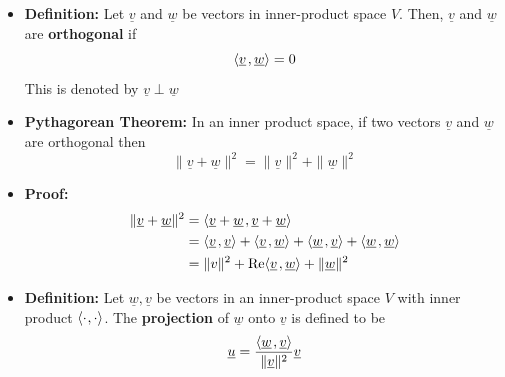 \documentclass[11pt,twoside]{report}
\newcommand{\vecnot}{\underline}
\newcommand{\Real}{\mathrm{Re}}
\newcommand{\inner}[2]{{\left\langle #1 \mskip2mu , #2 \right\rangle}}
\newcommand{\tinner}[2]{{\langle #1 \mskip1mu , #2 \rangle}}
\begin{document}
\begin{itemize}

\item \textbf{Definition:}  Let $\vecnot{v}$ and $\vecnot{w}$ be vectors in inner-product space $V$. Then, $\vecnot{v}$ and $\vecnot{w}$ are \textbf{orthogonal} if 
\[
\inner{\vecnot{v}}{ \vecnot{w}} = 0 %
\]
This is denoted by $\vecnot{v} \perp \vecnot{w} $



\item \textbf{Pythagorean Theorem:} In an inner product space, if two vectors $\vecnot{v}$ and $\vecnot{w}$  are orthogonal then 
\[
 \| \vecnot{v}  + \vecnot{w}\|^2 = \| \vecnot{v} \|^2  + \|\vecnot{w}\|^2
\]

\item \textbf{Proof:} 
\begin{align*}
\| \vecnot{v}  + \vecnot{w}\|^2 & = \inner{ \vecnot{v}  + \vecnot{w}}{\vecnot{v}  + \vecnot{w}} \\
& =  \inner{ \vecnot{v} }{\vecnot{v}  } +  \inner{ \vecnot{v} }{ \vecnot{w}} +  \inner{ \vecnot{w}}{ \vecnot{v} } +  \inner{   \vecnot{w}}{  \vecnot{w}}\\
& = \|v\|^2 +  \Real \inner{ \vecnot{v} }{ \vecnot{w}} +   \|\vecnot{w}\|^2
\end{align*}


\item \textbf{Definition:} Let $\vecnot{w},\vecnot{v}$ be vectors in an inner-product space $V$ with inner product $\tinner{ \cdot }{ \cdot }$. The \textbf{projection} of $\vecnot{w}$ onto $\vecnot{v}$ is defined to be 
\[
 \vecnot{u} = \frac{\inner{ \vecnot{w} }{ \vecnot{v} }}{\|\vecnot{v}\|^2} \vecnot{v} 
 \]



\begin{center}


\end{center}
\end{itemize}
\end{document}
